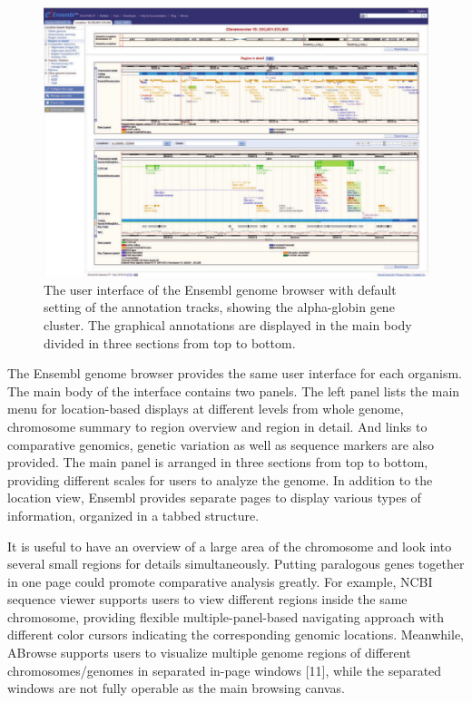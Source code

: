 \begin{figure}[!ht]
	\centering
	\includegraphics[width=.9\textwidth]{figures/ensembl_gb.png}
	\caption{The user interface of the Ensembl genome browser with default setting of the annotation tracks, showing the alpha-globin gene cluster. The graphical annotations are displayed in the main
	body divided in three sections from top to bottom.\label{o:latex_friendly_zone}}
\end{figure}

The Ensembl genome browser provides the same user interface for each organism. 
The main body of the interface contains two panels. 
The left panel lists the main menu for location-based displays at different levels from whole genome, chromosome summary to region overview and region in detail. 
And links to comparative genomics, genetic variation as well as sequence markers are also provided. 
The main panel is arranged in three sections from top to bottom, providing different scales for users to analyze the genome.
In addition to the location view, Ensembl provides separate pages to display various types of information, organized in a tabbed structure.

It is useful to have an overview of a large area of the chromosome and look into several small regions for details simultaneously. 
Putting paralogous genes together in one page could promote comparative analysis greatly. 
For example, NCBI sequence viewer supports users to view different regions inside the same chromosome, providing flexible multiple-panel-based navigating approach with different color cursors indicating the corresponding genomic locations.
Meanwhile, ABrowse supports users to visualize multiple genome regions of different chromosomes/genomes in separated in-page windows [11], while the separated windows are not fully operable as the main browsing canvas.

